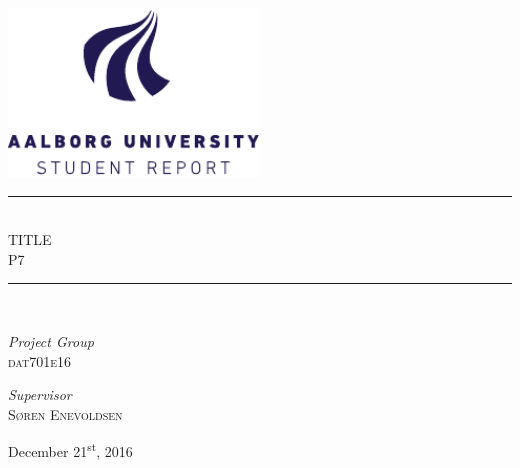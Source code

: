 \begin{titlepage}
\begin{center}
\newcommand{\HRule}{\rule{\linewidth}{0.5mm}}

\includegraphics[width=0.5\textwidth]{aau_logo_en.pdf}~\\[1cm]



\HRule \\[0.4cm]
{ \LARGE TITLE\\[0.4cm]
  \large \textsc{P7}}

\HRule \\[1.5cm]

\begin{minipage}{0.4\textwidth}
\begin{flushleft} \large
\emph{Project Group}\\
\textsc{dat701e16}
\end{flushleft}
\end{minipage}
\begin{minipage}{0.4\textwidth}
\begin{flushright} \large
\emph{Supervisor} \\
\textsc{Søren Enevoldsen}
\end{flushright}
\end{minipage}

\vfill

{\large December 21\textsuperscript{st}, 2016}

\end{center}
\end{titlepage}
